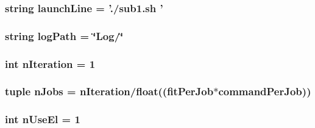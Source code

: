 \hypertarget{namespaceGenerateToyTemplates_a8eea97e1ca8a5a189a61413147b373bf}{
\subsubsection[{launch\+Line}]{\setlength{\rightskip}{0pt plus 5cm}string launch\+Line = './sub1.\+sh '}}\label{namespaceGenerateToyTemplates_a8eea97e1ca8a5a189a61413147b373bf}
\hypertarget{namespaceGenerateToyTemplates_a7f4934f0abd9c9e9d1da7b4b49fdfecc}{
\subsubsection[{log\+Path}]{\setlength{\rightskip}{0pt plus 5cm}string log\+Path = \char`\"{}Log/\char`\"{}}}\label{namespaceGenerateToyTemplates_a7f4934f0abd9c9e9d1da7b4b49fdfecc}
\hypertarget{namespaceGenerateToyTemplates_a6c89d21ce03405f979a97bbfe96a1169}{
\subsubsection[{n\+Iteration}]{\setlength{\rightskip}{0pt plus 5cm}int n\+Iteration = 1}}\label{namespaceGenerateToyTemplates_a6c89d21ce03405f979a97bbfe96a1169}
\hypertarget{namespaceGenerateToyTemplates_abab193068c223e1d91bfd2839e6ad48a}{
\subsubsection[{n\+Jobs}]{\setlength{\rightskip}{0pt plus 5cm}tuple n\+Jobs = {\bf n\+Iteration}/float(({\bf fit\+Per\+Job}$\ast${\bf command\+Per\+Job}))}}\label{namespaceGenerateToyTemplates_abab193068c223e1d91bfd2839e6ad48a}
\hypertarget{namespaceGenerateToyTemplates_a82b5d2cf7a53a81e6b18c90ad139db27}{
\subsubsection[{n\+Use\+El}]{\setlength{\rightskip}{0pt plus 5cm}int n\+Use\+El = 1}}\label{namespaceGenerateToyTemplates_a82b5d2cf7a53a81e6b18c90ad139db27}
